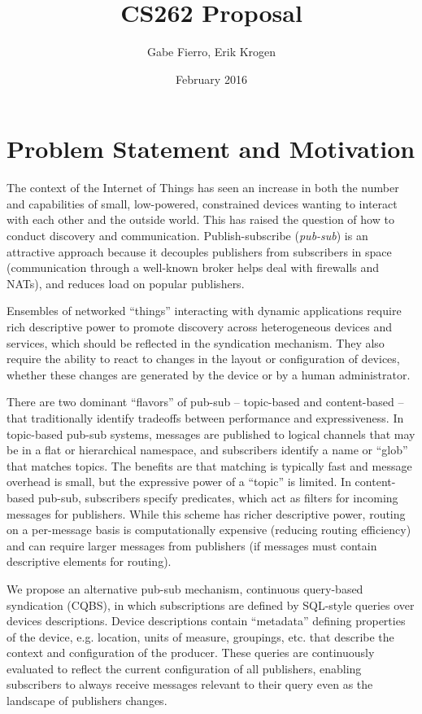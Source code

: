 \documentclass{article}
\title{CS262 Proposal}
\author{Gabe Fierro, Erik Krogen}
\date{February 2016}
\begin{document}
\maketitle

\section{Problem Statement and Motivation}

The context of the Internet of Things has seen an increase in both the number
and capabilities of small, low-powered, constrained devices wanting to interact
with each other and the outside world.  This has raised the question of how to
conduct discovery and communication. Publish-subscribe (\emph{pub-sub}) is
an attractive approach because it decouples publishers from subscribers in
space (communication through a well-known broker helps deal with firewalls and
NATs), and reduces load on popular publishers.

Ensembles of networked ``things'' interacting with dynamic applications require
rich descriptive power to promote discovery across heterogeneous devices and
services, which should be reflected in the syndication mechanism. They also require
the ability to react to changes in the layout or configuration of devices, whether
these changes are generated by the device or by a human administrator. 


There are two dominant ``flavors'' of pub-sub -- topic-based and content-based
-- that traditionally identify
tradeoffs between performance and expressiveness. In topic-based pub-sub
systems, messages are published to logical channels that may be in a flat or
hierarchical namespace, and subscribers identify a name or ``glob'' that
matches topics. The benefits are that matching is typically fast and message
overhead is small, but the expressive power of a ``topic'' is limited.  In
content-based pub-sub, subscribers specify predicates, which act as filters for
incoming messages for publishers. While this scheme has richer descriptive
power, routing on a per-message basis is computationally expensive (reducing
routing efficiency) and can require larger messages from publishers (if
messages must contain descriptive elements for routing).

We propose an alternative pub-sub mechanism, continuous query-based syndication (CQBS),
in which subscriptions are defined by SQL-style queries over devices descriptions. 
Device descriptions contain ``metadata'' defining properties of the device, e.g. location,
units of measure, groupings, etc. that describe the context and configuration of the producer. 
These queries are continuously evaluated to reflect the current configuration of all publishers, enabling
subscribers to always receive messages relevant to their query even as the landscape of
publishers changes.
\end{document}
